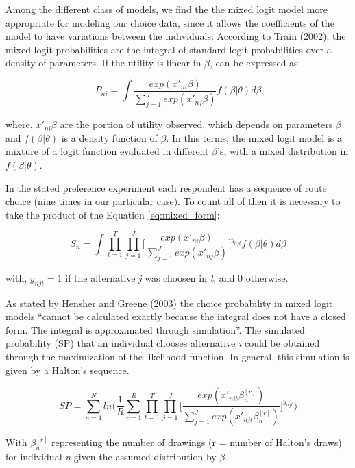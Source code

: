 \documentclass[]{elsarticle} %
\begin{document}
Among the different class of models, we find the the mixed logit model
more appropriate for modeling our choice data, since it allows the
coefficients of the model to have variations between the individuals.
According to Train (2002), the mixed logit probabilities are the
integral of standard logit probabilities over a density of parameters.
If the utility is linear in \(\beta\), can be expressed as:

\begin{equation}
    P_{ni} = \int \frac{exp(x'_{ni}\beta)}{\sum^J_{j=1}exp(x'_{nj}\beta)}f(\beta|\theta)d\beta
\label{eq:mixed_form}
\end{equation}

where, \(x'_{ni}\beta\) are the portion of utility observed, which
depends on parameters \(\beta\) and \(f(\beta|\theta)\) is a density
function of \(\beta\). In this terms, the mixed logit model is a mixture
of a logit function evaluated in different \(\beta\)'s, with a mixed
distribution in \(f(\beta|\theta)\).

In the stated preference experiment each respondent has a sequence of
route choice (nine times in our particular case). To count all of then
it is necessary to take the product of the Equation \ref{eq:mixed_form}:

\[
    S_{n} = \int \prod^T_{t=1} \prod^J_{j=1} \Bigg[\frac{exp(x'_{ni}\beta)}{\sum^J_{j=1}exp(x'_{nj}\beta)}\Bigg]^{y_{njt}}f(\beta|\theta)d\beta
\]

with, \(y_{njt}= 1\) if the alternative \emph{j} was choosen in
\emph{t}, and 0 otherwise.

As stated by Hensher and Greene (2003) the choice probability in mixed
logit models ``cannot be calculated exactly because the integral does
not have a closed form. The integral is approximated through
simulation''. The simulated probability (SP) that an individual chooses
alternative \emph{i} could be obtained through the maximization of the
likelihood function. In general, this simulation is given by a Halton's
sequence.

\begin{equation}
    SP = \sum^N_{n=1}ln \Big(\frac{1}{R} \sum^R_{r=1} \prod^T_{t=1} \prod^J_{j=1} \Bigg[\frac{exp(x'_{nit}\beta^{[r]}_n)}{\sum^J_{j=1}exp(x'_{njt}\beta^{[r]}_n)}\Bigg]^{y_{njt}} \Big)
\end{equation}

With \(\beta^{[r]}_n\) representing the number of drawings (r = number
of Halton's draws) for individual \emph{n} given the assumed
distribution by \(\beta\).
\end{document}
